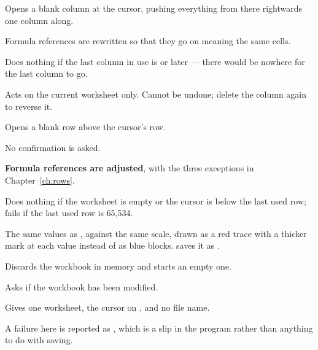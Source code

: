 
Opens a blank column at the cursor, pushing everything from there rightwards
one column along.

\begin{ccsteps}
\item Formula references are rewritten so that they go on meaning the same
cells.
\item Does nothing if the last column in use is  or later --- there
would be nowhere for the last column to go.
\item Acts on the current worksheet only. Cannot be undone; delete the column
again to reverse it.
\end{ccsteps}


Opens a blank row above the cursor's row.

\begin{ccsteps}
\item No confirmation is asked.
\item \textbf{Formula references are adjusted}, with the three exceptions in
Chapter~\ref{ch:rows}.
\item Does nothing if the worksheet is empty or the cursor is below the last
used row; fails if the last used row is 65,534.
\end{ccsteps}


The same values as , against the same scale, drawn as a red
trace with a thicker mark at each value instead of as blue blocks. 
saves it as .


Discards the workbook in memory and starts an empty one.

\begin{ccsteps}
\item Asks  if the workbook has been modified.
\item Gives one worksheet, the cursor on , and no file name.
\item A failure here is reported as , which is a slip in the
program rather than anything to do with saving.
\end{ccsteps}


